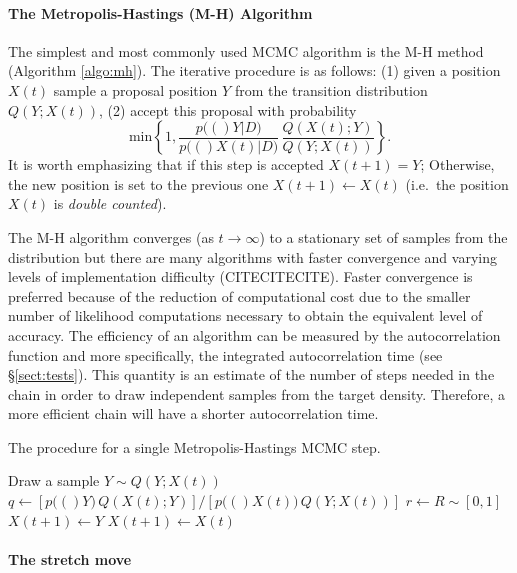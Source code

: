 \documentclass[12pt,preprint]{aastex}
\newcommand{\sect}[1]{\S\ref{sect:#1}}
\newcommand{\algo}[1]{Algorithm \ref{algo:#1}}
\newcommand{\algolabel}[1]{\label{algo:#1}}
\renewcommand{\vector}[1]{#1}
\newcommand{\pr}[1]{\ensuremath{p(#1)}}
\newcommand{\data}{\ensuremath{\vector{D}}}
\begin{document}
\paragraph{The Metropolis-Hastings (M-H) Algorithm}

The simplest and most commonly used MCMC algorithm is the M-H method
(\algo{mh}). The iterative procedure is as follows: (1) given a position
$X(t)$ sample a proposal position $Y$ from the transition distribution
$Q(Y; X(t))$, (2) accept this proposal with probability
\begin{equation}
    \mathrm{min} \left \{ 1,
            \frac{\pr(\vector{Y} | \data)}{\pr(\vector{X}(t) | \data)} \,
            \frac{Q(X(t); Y)}{ Q(Y;X(t))}  \right \}.
\end{equation}
It is worth emphasizing that if this step is accepted $X(t+1) = Y$; Otherwise,
the new position is set to the previous one $X(t+1) \gets X(t)$ (i.e.~the
position $X(t)$ is \emph{double counted}).

The M-H algorithm converges (as $t \to \infty$) to a stationary set of
samples from the distribution but there are many algorithms with faster
convergence and varying levels of implementation difficulty (CITECITECITE).
Faster convergence is preferred because of the reduction of computational
cost due to the smaller number of likelihood computations necessary to obtain
the equivalent level of accuracy. The efficiency of an algorithm can be
measured by the autocorrelation function and more specifically, the integrated
autocorrelation time (see \sect{tests}). This quantity is an estimate of the
number of steps needed in the chain in order to draw independent samples from
the target density. Therefore, a more efficient chain will have a shorter
autocorrelation time.

\begin{algorithm}
\caption{The procedure for a single Metropolis-Hastings MCMC step.
    \algolabel{mh}}
\begin{algorithmic}[1]

\STATE Draw a sample $Y \sim Q (Y; X(t))$
\STATE $q \gets [\pr(\vector{Y}) \, Q(X(t); Y)]
        / [\pr(\vector{X}(t)) \, Q(Y;X(t))]$
\STATE $r \gets R \sim [0, 1]$
    \STATE $\vector{X}(t+1) \gets \vector{Y}$
\ELSE
    \STATE $\vector{X}(t+1) \gets \vector{X}(t)$
\ENDIF

\end{algorithmic}
\end{algorithm}

\paragraph{The stretch move}
\end{document}
